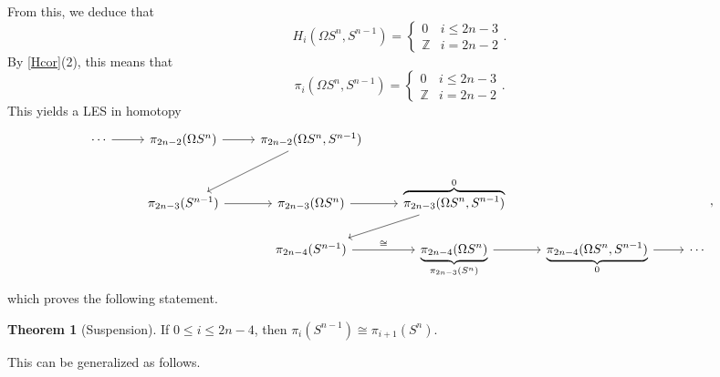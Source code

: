 \documentclass[10pt,letterpaper,cm]{nupset}
\theoremstyle{definition}
\theoremstyle{theorem}
\newtheorem{theorem}[defn]{Theorem}
\theoremstyle{remark}
\newcommand{\Z}{\mathbb Z}
\newcommand{\1}{\mathbb{1}}
\newcommand{\0}{\vec 0}
\begin{document}
From this, we deduce that
\[
H_i(\Omega{S^n}, S^{n-1}) = \begin{cases} 0 & i \leq 2n-3
\\ \Z & i = 2n-2
\end{cases}.
\] By \cref{Hcor}(2), this means that
\[
\pi_i(\Omega{S^n}, S^{n-1}) = \begin{cases} 0 & i \leq 2n-3
\\ \Z & i = 2n-2
\end{cases}.
\]
This yields a LES in homotopy
\[
\begin{tikzcd}
\cdots \arrow[r] & \pi_{2n-2}(\Omega{S^n}) \arrow[r] & {\pi_{2n-2}(\Omega{S^n}, S^{n-1})} \arrow[ld] &                                                                  &                                                               &        \\
                 & \pi_{2n-3}(S^{n-1}) \arrow[r]     & \pi_{2n-3}(\Omega{S^n}) \arrow[r]             & {\overbrace{\pi_{2n-3}(\Omega{S^n}, S^{n-1})}^{0}} \arrow[ld]    &                                                               &        \\
                 &                                   & \pi_{2n-4}(S^{n-1}) \arrow[r, "\cong"]        & \underbrace{\pi_{2n-4}(\Omega{S^n})}_{\pi_{2n-3}(S^n)} \arrow[r] & {\underbrace{\pi_{2n-4}(\Omega{S^n}, S^{n-1})}_{0}} \arrow[r] & \cdots
\end{tikzcd},
\] which proves the following statement.

\begin{theorem}[Suspension]\label{ST}
If $0\leq i\leq 2n-4$, then $\pi_i(S^{n-1}) \cong \pi_{i+1}(S^n)$.
\end{theorem}

This can be generalized as follows.

\smallskip
\end{document}
